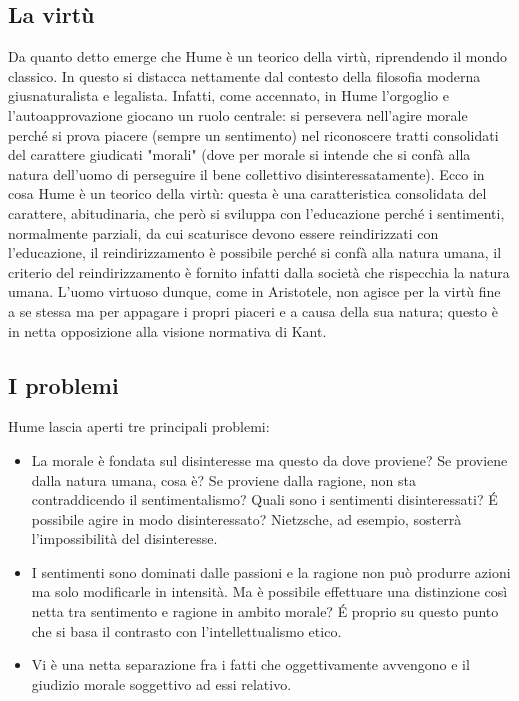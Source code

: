 \documentclass[10pt,a4paper]{article}
\begin{document}
\subsection{La virtù}
Da quanto detto emerge che Hume è un teorico della virtù, riprendendo il mondo classico. In questo si distacca nettamente dal contesto della filosofia moderna giusnaturalista e legalista. Infatti, come accennato, in Hume l'orgoglio e l'autoapprovazione giocano un ruolo centrale: si persevera nell'agire morale perché si prova piacere (sempre un sentimento) nel riconoscere tratti consolidati del carattere giudicati "morali" (dove per morale si intende che si confà alla natura dell'uomo di perseguire il bene collettivo disinteressatamente). Ecco in cosa Hume è un teorico della virtù: questa è una caratteristica consolidata del carattere, abitudinaria, che però si sviluppa con l'educazione perché i sentimenti, normalmente parziali, da cui scaturisce devono essere reindirizzati con l'educazione, il reindirizzamento è possibile perché si confà alla natura umana, il criterio del reindirizzamento è fornito infatti dalla società che rispecchia la natura umana. L'uomo virtuoso dunque, come in Aristotele, non agisce per la virtù fine a se stessa ma per appagare i propri piaceri e a causa della sua natura; questo è in netta opposizione alla visione normativa di Kant.
\subsection{I problemi}
Hume lascia aperti tre principali problemi:
\begin{itemize}
	\item La morale è fondata sul disinteresse ma questo da dove proviene? Se proviene dalla natura umana, cosa è? Se proviene dalla ragione, non sta contraddicendo il sentimentalismo? Quali sono i sentimenti disinteressati? \'E possibile agire in modo disinteressato? Nietzsche, ad esempio, sosterrà l'impossibilità del disinteresse.
	\item I sentimenti sono dominati dalle passioni e la ragione non può produrre azioni ma solo modificarle in intensità. Ma è possibile effettuare una distinzione così netta tra sentimento e ragione in ambito morale? \'E proprio su questo punto che si basa il contrasto con l'intellettualismo etico.
	\item Vi è una netta separazione fra i fatti che oggettivamente avvengono e il giudizio morale soggettivo ad essi relativo. 
\end{itemize}
\newpage
\end{document}
